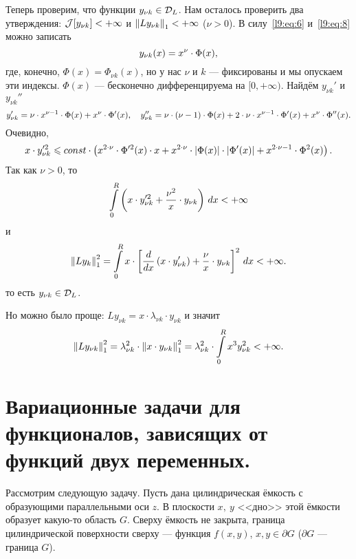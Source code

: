 Теперь проверим, что функции $y_{\nu k}\in\mathcal{D}_L$. Нам осталось проверить два утверждения: $\J[y_{\nu k}]\?<+\infty$ и $\left\|Ly_{\nu k}\right\|_1<+\infty$ ($\nu>0$). В силу~\eqref{l9:eq:6} и~\eqref{l9:eq:8} можно записать
\begin{equation*}
	\hfill y_{\nu k}(x)=x^{\nu}\cdot\Phi(x),\hfill 
\end{equation*}
где, конечно, $\Phi(x)=\Phi_{\nu k}(x)$, но у нас $\nu$ и $k$ --- фиксированы и мы опускаем эти индексы. $\Phi(x)$ --- бесконечно дифференцируема на $[0,+\infty)$. Найдём $y_{\nu k}'$ и $y_{\nu k}''$
\begin{equation*}
	\hfill y_{\nu k}'=\nu\cdot x^{\nu-1}\cdot\Phi(x)+x^{\nu}\cdot\Phi'(x),\quad y_{\nu k}''=\nu\cdot(\nu-1)\cdot\Phi(x)+2\cdot\nu\cdot x^{\nu-1}\cdot\Phi'(x)+x^{\nu}\cdot\Phi''(x).\hfill
\end{equation*}
Очевидно,
\begin{equation*}
	\hfill x\cdot y_{\nu k}^{\prime2}\leqslant const\cdot\left(x^{2\cdot\nu}\cdot\Phi^{\prime2}(x)\cdot x+x^{2\cdot\nu}\cdot|\Phi(x)|\cdot|\Phi'(x)|+x^{2\cdot\nu-1}\cdot\Phi^2(x)\right).\hfill
\end{equation*}
Так как $\nu>0$, то
\begin{equation*}
	\hfill\int\limits_0^R\left(x\cdot y_{\nu k}^{\prime2}+\frac{\nu^2}{x}\cdot y_{\nu k}\right)\,dx<+\infty\hfill
\end{equation*}
и 
\begin{equation*}
	\hfill\norm{Ly_k}_1^2=\int\limits_0^R x\cdot\left[\der{}{x}\left(x\cdot y_{\nu k}'\right)+\frac{\nu}{x}\cdot y_{\nu k}\right]^2\,dx<+\infty.\hfill
\end{equation*}
то есть $y_{\nu k}\in\mathcal{D}_L$. 

Но можно было проще: $Ly_{\nu k}=x\cdot\lambda_{\nu k}\cdot y_{\nu k}$ и значит
\begin{equation*}
	\hfill\norm{Ly_{\nu k}}_1^2=\lambda_{\nu k}^2\cdot\norm{x\cdot y_{\nu k}}_1^2=\lambda_{\nu k}^2\cdot\int\limits_0^R x^3 y_{\nu k}^2<+\infty.\hfill
\end{equation*} 
\section[Функционалы, зависящие от функций двух переменных.]{Вариационные задачи для функционалов, зависящих от функций двух переменных.}
\label{lecture9section2}
Рассмотрим следующую задачу. Пусть дана цилиндрическая ёмкость с образующими параллельными оси $z$. В плоскости $x,\ y$ <<дно>> этой ёмкости образует какую-то область $G$. Сверху ёмкость не закрыта, граница цилиндрической поверхности сверху --- функция $f(x,y)$, $x,y\in\partial G$ ($\partial G$ --- граница $G$).



